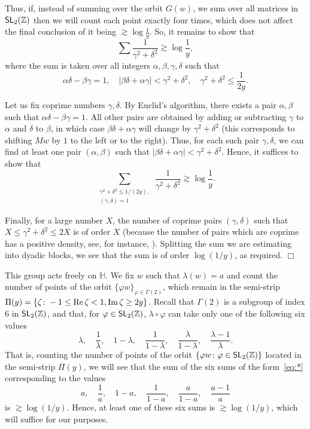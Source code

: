 \documentclass[12pt]{paper}
\newcommand{\bZ}{\mathbb Z}
\newcommand{\bH}{\mathbb H}
\renewcommand{\phi}{\varphi}
\newcommand{\im}{{\rm Im}\,}
\newcommand{\re}{{\rm Re}\,}
\begin{document}
Thus, if, instead of summing over the orbit $G(w)$, we sum over all matrices in $ {\sf SL}_2(\bZ)$ then we will count each point exactly four times, which does not affect the final conclusion of it being $\gtrsim \log \frac{1}{y}$. So, it remains to show that
$$\sum \frac{1}{\gamma^2+\delta^2} \gtrsim \log \frac{1}{y},$$
where the sum is taken over all integers $\alpha, \beta, \gamma, \delta$ such that
\[
\alpha\delta-\beta\gamma = 1, \quad |\beta\delta + \alpha\gamma| < \gamma^2+\delta^2, \quad 
\gamma^2+\delta^2\le \frac{1}{2y}.
\]

Let us fix coprime numbers $\gamma, \delta$. By Euclid’s algorithm, there exists a pair $\alpha, \beta$ such that $\alpha \delta - \beta \gamma =1$. All other pairs are obtained by adding or subtracting $\gamma$ to $\alpha$ and $\delta$ to $\beta$, in which
case $\beta\delta+\alpha\gamma$ will change by $\gamma^2+\delta^2$ (this corresponds to shifting $Mw$ by $1$ to the left or to the right). Thus, for each such pair $\gamma, \delta$, we can find at least one pair $(\alpha, \beta)$ such that $|\beta\delta + \alpha\gamma| < \gamma^2+\delta^2$. Hence, it suffices to show that 
$$\sum_{\substack { \gamma^2 + \delta^2 \le 1/(2y), \\ (\gamma, \delta)=1}}\,
\frac1{\gamma^2+\delta^2}\gtrsim \log \frac{1}{y}.$$

Finally, for a large number $X$, the number of coprime pairs 
$(\gamma, \delta)$ such that $X \le \gamma^2 + \delta^2 \le 2X$ is of order $X$ (because 
the number of pairs which are coprime has a positive density, see, for instance, \cite[Theorem~ 332]{HW}). 
Splitting the sum we are estimating into
dyadic blocks, we see that the sum is of order $\log (1/y)$, as required. \hfill $\Box$  

\iffalse

This group acts freely on $\bH$. We fix $w$ such that $\lambda (w)=a$ and count the number of points
of the orbit $\{\phi w \}_{\phi\in \Gamma (2)}$,  which remain in the semi-strip 
$\Pi(y)=\{\zeta\colon -1\le \re \zeta <1, \im \zeta \ge 2y\}$. Recall that $\Gamma (2)$ is a subgroup of index $6$ in 
${\sf SL}_2(\bZ)$, and that, for $\phi\in {\sf SL}_2(\bZ)$, $\lambda \circ \phi$ can take 
only one of the following six values
\[
\lambda,  \quad \frac1{\lambda}, \quad 1-\lambda, \quad  
\frac1{1-\lambda}, \quad \frac{\lambda}{1-\lambda}, \quad \frac{\lambda-1}\lambda.
\]
That is, counting the number of points of the orbit $\{\phi w\colon \phi\in {\sf SL}_2(\bZ)\}$ located in the
semi-strip $\Pi (y)$, we will see that the sum of the six sums of the form~\eqref{eq:*} corresponding 
to the values 
\[
a,  \quad \frac1a, \quad 1-a, \quad  
\frac1{1-a}, \quad \frac{a}{1-a}, \quad \frac{a-1}a
\]
is $\gtrsim \log(1/y)$. Hence, at least one of these six sums is $\gtrsim \log(1/y)$, 
which will suffice for our purposes. 
\end{document}
